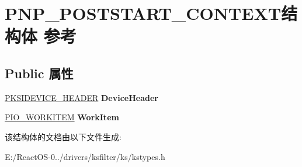\hypertarget{struct_p_n_p___p_o_s_t_s_t_a_r_t___c_o_n_t_e_x_t}{}\section{P\+N\+P\+\_\+\+P\+O\+S\+T\+S\+T\+A\+R\+T\+\_\+\+C\+O\+N\+T\+E\+X\+T结构体 参考}
\label{struct_p_n_p___p_o_s_t_s_t_a_r_t___c_o_n_t_e_x_t}
\subsection*{Public 属性}
\begin{DoxyCompactItemize}
\item 
\mbox{\label{struct_p_n_p___p_o_s_t_s_t_a_r_t___c_o_n_t_e_x_t_ab2cda498aa9a0028c8bd8eb79d375619}} 
\hyperlink{struct_k_s_i_d_e_v_i_c_e___h_e_a_d_e_r}{P\+K\+S\+I\+D\+E\+V\+I\+C\+E\+\_\+\+H\+E\+A\+D\+ER} {\bfseries Device\+Header}
\item 
\mbox{\label{struct_p_n_p___p_o_s_t_s_t_a_r_t___c_o_n_t_e_x_t_ae8f46a2b63e0be86076a208a66d202c6}} 
\hyperlink{struct___i_o___w_o_r_k_i_t_e_m}{P\+I\+O\+\_\+\+W\+O\+R\+K\+I\+T\+EM} {\bfseries Work\+Item}
\end{DoxyCompactItemize}


该结构体的文档由以下文件生成\+:\begin{DoxyCompactItemize}
\item 
E\+:/\+React\+O\+S-\/0../drivers/ksfilter/ks/kstypes.\+h\end{DoxyCompactItemize}
